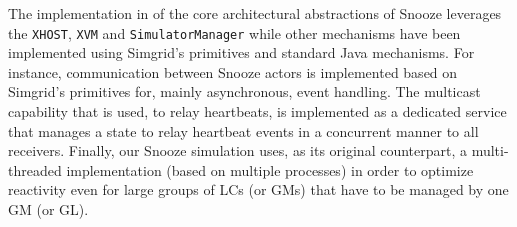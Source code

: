 The implementation in \vmps of the core architectural abstractions of
Snooze %
leverages the \texttt{XHOST}, \texttt{XVM} and
\texttt{SimulatorManager} while other mechanisms have been implemented
using Simgrid's primitives and standard Java mechanisms.
%
For instance, communication between Snooze actors is implemented based
on Simgrid's primitives for, mainly asynchronous, event handling.  The
multicast capability that is used, \eg to relay heartbeats, is
implemented as a dedicated service that manages a state to relay
heartbeat events in a concurrent manner to all receivers.
%
Finally, our Snooze simulation uses, as its original counterpart, a
multi-threaded implementation (\ie based on multiple \sg processes) in
order to optimize reactivity even for large groups of LCs (or GMs)
that have to be managed by one GM (or GL).







